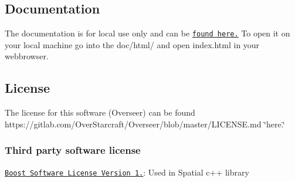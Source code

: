 \subsection*{Documentation}

The documentation is for local use only and can be \href{https://mejan.github.io}{\tt found here.} To open it on your local machine go into the doc/html/ and open index.\+html in your webbrowser.

\subsection*{License}

The license for this software (Overseer) can be found https\+://gitlab.com/\+Over\+Starcraft/\+Overseer/blob/master/\+L\+I\+C\+E\+N\+S\+E.\+md \char`\"{}here.\char`\"{}

\subsubsection*{Third party software license}


\begin{DoxyItemize}
\item \href{http://www.boost.org/LICENSE_1_0.txt}{\tt Boost Software License Version 1.}\+: Used in Spatial c++ library 
\end{DoxyItemize}